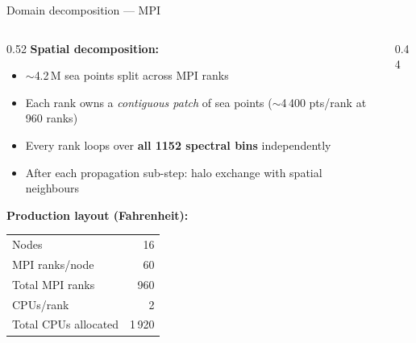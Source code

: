\documentclass[aspectratio=169,10pt]{beamer}
\begin{document}
\begin{frame}[shrink=8]{Domain decomposition --- MPI}

  \begin{columns}[T]
    \begin{column}{0.52\textwidth}
      \textbf{Spatial decomposition:}
      \begin{itemize}
        \item $\sim$4.2\,M sea points split across MPI ranks
        \item Each rank owns a \emph{contiguous patch} of sea points
              ($\sim$4\,400 pts/rank at 960 ranks)
        \item Every rank loops over \textbf{all 1152 spectral bins}
              independently
        \item After each propagation sub-step: halo exchange with
              spatial neighbours
      \end{itemize}

      \vspace{0.6em}
      \textbf{Production layout (Fahrenheit):}
      \begin{center}
        \begin{tabular}{lr}
          \toprule
          Nodes & 16 \\
          MPI ranks/node & 60 \\
          Total MPI ranks & 960 \\
          CPUs/rank & 2 \\
          Total CPUs allocated & 1\,920 \\
          \bottomrule
        \end{tabular}
      \end{center}
    \end{column}

    \begin{column}{0.44\textwidth}
      \begin{center}
\end{center}
\end{column}
\end{columns}
\end{frame}
\end{document}
